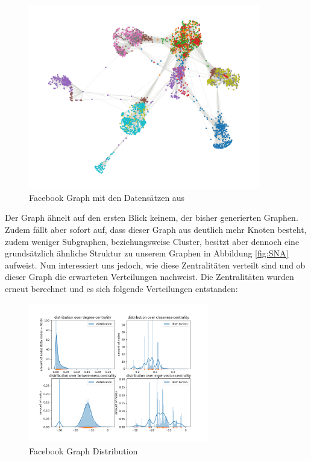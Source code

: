 \FloatBarrier
\begin{figure}[h!]%
  \centering
 \includegraphics[width=0.9\textwidth]{Graphics/FacebookPoliticalPlot.png}
  \caption{Facebook Graph mit den Datensätzen aus \cite{FBData}}
  \label{fig:FacebookGraph}
\end{figure}
\FloatBarrier



Der Graph ähnelt auf den ersten Blick keinem, der bisher generierten Graphen. Zudem fällt aber sofort auf, dass dieser Graph aus deutlich mehr Knoten besteht, zudem weniger Subgraphen, beziehungsweise Cluster, besitzt aber dennoch eine grundsätzlich ähnliche Struktur zu unserem Graphen in Abbildung \ref{fig:SNA} aufweist. Nun interessiert uns jedoch, wie diese Zentralitäten verteilt sind und ob dieser Graph die erwarteten Verteilungen nachweist. Die Zentralitäten wurden erneut berechnet und es sich folgende Verteilungen entstanden:

\FloatBarrier
\begin{figure}[h!]%
  \centering
\includegraphics[width=0.7\textwidth]{Graphics/facebookLOG.png}
  \caption{Facebook Graph Distribution}
  \label{fig:FacebookGraphDistribution}
\end{figure}
\FloatBarrier

